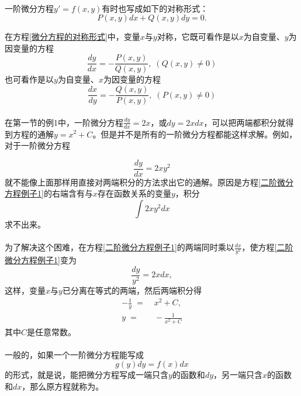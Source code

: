 \paragraph{}
一阶微分方程$y'=f(x,y)$有时也写成如下的对称形式：
\begin{equation}
  \label{微分方程的对称形式}
  P(x,y)dx + Q(x,y)dy = 0.
\end{equation}

在方程\eqref{微分方程的对称形式}中，变量$x$与$y$对称，它既可看作是以$x$为自变量、$y$为因变量的方程
\begin{equation}
  \frac{dy}{dx} = -\frac{P(x,y)}{Q(x,y)}, \; (Q(x,y) \neq 0)
\end{equation}
也可看作是以$y$为自变量、$x$为因变量的方程
\begin{equation}
  \frac{dx}{dy} = -\frac{Q(x,y)}{P(x,y)}, \; (P(x,y) \neq 0)
\end{equation}

\paragraph{}
在第一节的例1中，一阶微分方程$\displaystyle \frac{dy}{dx}=2x$，或$dy=2xdx$，可以把两端都积分就得到方程的通解$y=x^2+C$。但是并不是所有的一阶微分方程都能这样求解。例如，对于一阶微分方程

\begin{equation}
  \label{二阶微分方程例子1}
  \frac{dy}{dx}=2xy^2
\end{equation}
就不能像上面那样用直接对两端积分的方法求出它的通解。原因是方程\eqref{二阶微分方程例子1}的右端含有与$x$存在函数关系的变量$y$，积分
\begin{equation}
  \int{2xy^2dx}
\end{equation}
求不出来。

\paragraph{}
为了解决这个困难，在方程\eqref{二阶微分方程例子1}的两端同时乘以$\displaystyle \frac{dx}{y^2}$，使方程\eqref{二阶微分方程例子1}变为
\begin{equation}
  \frac{dy}{y^2}=2xdx,
\end{equation}
这样，变量$x$与$y$已分离在等式的两端，然后两端积分得
\begin{align}
  -\frac{1}{y} \;=&\; x^2 + C, \\
  y \;=&\; -\frac{1}{x^2+C}
\end{align}
其中$C$是任意常数。

\paragraph{}
一般的，如果一个一阶微分方程能写成
\begin{equation}
  \label{可分离变量的微分方程}
  g(y)dy = f(x)dx
\end{equation}
的形式，就是说，能把微分方程写成一端只含$y$的函数和$dy$，另一端只含$x$的函数和$dx$，那么原方程就称为。

